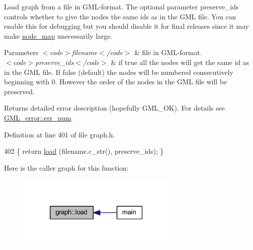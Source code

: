 Load graph from a file in G\+M\+L-\/format. The optional parameter {\ttfamily preserve\+\_\+ids} controls whether to give the nodes the same ids as in the G\+ML file. You can enable this for debugging but you should disable it for final releases since it may make {\ttfamily \mbox{\hyperlink{classnode__map}{node\+\_\+map}}} unecessarily large. ~\newline
 
\begin{DoxyParams}{Parameters}
{\em $<$code$>$filename$<$/code$>$} & file in G\+M\+L-\/format. ~\newline
\\
\hline
{\em $<$code$>$preserve\+\_\+ids$<$/code$>$} & if true all the nodes will get the same id as in the G\+ML file. If false (default) the nodes will be numbered consecutively beginning with 0. However the order of the nodes in the G\+ML file will be preserved. \\
\hline
\end{DoxyParams}
\begin{DoxyReturn}{Returns}
detailed error description (hopefully G\+M\+L\+\_\+\+OK). For details see \mbox{\hyperlink{struct_g_m_l__error_a66fe2c5a3d2d40e77ff486007dfe7f76}{G\+M\+L\+\_\+error\+::err\+\_\+num}}. 
\end{DoxyReturn}


Definition at line 401 of file graph.\+h.


\begin{DoxyCode}
402     \{ \textcolor{keywordflow}{return} \mbox{\hyperlink{classgraph_ac28cb3468623a480709d3329033d4ec8}{load}} (filename.c\_str(), preserve\_ids); \}
\end{DoxyCode}
Here is the caller graph for this function\+:
\nopagebreak
\begin{figure}[H]
\begin{center}
\leavevmode
\includegraphics[width=219pt]{classgraph_ac28cb3468623a480709d3329033d4ec8_icgraph}
\end{center}
\end{figure}
\mbox{\label{classgraph_a37c17685e1becc66723699d4c9db072b}} 
